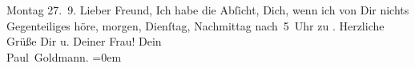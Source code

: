 \begin{ledgroupsized}[t]{13cm}
           \pstart
           {\pb}Montag 27. 9.\pend
           \pstart
           Lieber Freund, Ich habe die Abſicht, Dich, wenn ich von
               Dir nichts Gegenteiliges höre, morgen, Dienſtag, Nachmittag nach 5 Uhr zu \label{K-L03252-2v}\label{K-L03252-2h}. Herzliche Grüße Dir u. Deiner Frau!\pend
           \pstart
           Dein {\\[\baselineskip]}\spacefill\mbox{Paul Goldmann.}\pend
           \leftskip=0em{}
         
         \endnumbering{}\end{ledgroupsized}  \newcommand{\dateiname}{L03252}\newcommand{\titel}{Paul Goldmann an Arthur Schnitzler, 27. 9. 1909}\newcommand{\editorInnen}{Martin Anton Müller und Laura Untner}
      